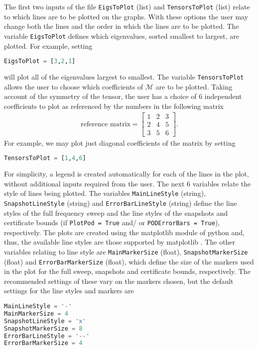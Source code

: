 \noindent
The first two inputs of the file \texttt{EigsToPlot} (list) and \texttt{TensorsToPlot} (list) relate to which lines are to be plotted on the graphs. With these options the user may change both the lines and the order in which the lines are to be plotted. The variable \texttt{EigsToPlot} defines which eigenvalues, sorted smallest to largest, are plotted. For example, setting
\begin{lstlisting}[language=Python]
EigsToPlot = [3,2,1]
\end{lstlisting}
will plot all of the eigenvalues largest to smallest. The variable \texttt{TensorsToPlot} allows the user to choose which  coefficients of $\mathcal{M}$ are to be plotted. Taking account of the symmetry of the tensor,  the user has a choice of 6 independent coefficients to plot as referenced by the numbers in the following matrix
\begin{align}
\textrm{reference matrix}=\left[\begin{array}{ccc}
1 & 2 & 3\\
2 & 4 & 5\\
3 & 5 & 6
\end{array}\right].
\end{align}
For example, we may plot just diagonal coefficients of the matrix by setting
\begin{lstlisting}[language=Python]
TensorsToPlot = [1,4,6]
\end{lstlisting}
For simplicity, a legend is created automatically for each of the lines in the plot, without additional inputs required from the user. The next 6 variables relate the style of lines being plotted. The variables \texttt{MainLineStyle} (string), \texttt{SnapshotLineStyle} (string) and \texttt{ErrorBarLineStyle} (string) define the line styles of the full frequency sweep and the line styles of the snapshots and certificate bounds (if \texttt{PlotPod = True} and/ or \texttt{PODErrorBars = True}), respectively. The plots are created using the matplotlib module of python and, thus, the available line styles are those supported by matplotlib \cite{matplotlib}. The other variables relating to line style are \texttt{MainMarkerSize} (float), \texttt{SnapshotMarkerSize} (float) and \texttt{ErrorBarMarkerSize} (float), which define the size of the markers used in the plot for the full sweep, snapshots and certificate bounds, respectively. The recommended settings of these vary on the markers chosen, but the default settings for the line styles and markers are
\begin{lstlisting}[language=Python]
MainLineStyle = '-'
MainMarkerSize = 4
SnapshotLineStyle = 'x'
SnapshotMarkerSize = 8
ErrorBarLineStyle = '--'
ErrorBarMarkerSize = 4
\end{lstlisting}

